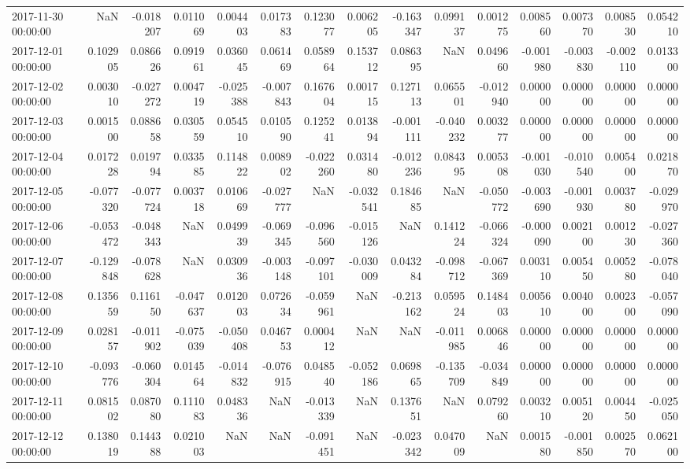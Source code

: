 \begin{tabular}{lrrrrrrrrrrrrrr}
2017-11-30 00:00:00 & NaN & -0.018207 & 0.011069 & 0.004403 & 0.017383 & 0.123077 & 0.006205 & -0.163347 & 0.099137 & 0.001275 & 0.008560 & 0.007370 & 0.008530 & 0.054210 \\
2017-12-01 00:00:00 & 0.102905 & 0.086626 & 0.091961 & 0.036045 & 0.061469 & 0.058964 & 0.153712 & 0.086395 & NaN & 0.049660 & -0.001980 & -0.003830 & -0.002110 & 0.013300 \\
2017-12-02 00:00:00 & 0.003010 & -0.027272 & 0.004719 & -0.025388 & -0.007843 & 0.167604 & 0.001715 & 0.127113 & 0.065501 & -0.012940 & 0.000000 & 0.000000 & 0.000000 & 0.000000 \\
2017-12-03 00:00:00 & 0.001500 & 0.088658 & 0.030559 & 0.054510 & 0.010590 & 0.125241 & 0.013894 & -0.001111 & -0.040232 & 0.003277 & 0.000000 & 0.000000 & 0.000000 & 0.000000 \\
2017-12-04 00:00:00 & 0.017228 & 0.019794 & 0.033585 & 0.114822 & 0.008902 & -0.022260 & 0.031480 & -0.012236 & 0.084395 & 0.005308 & -0.001030 & -0.010540 & 0.005400 & 0.021870 \\
2017-12-05 00:00:00 & -0.077320 & -0.077724 & 0.003718 & 0.010669 & -0.027777 & NaN & -0.032541 & 0.184685 & NaN & -0.050772 & -0.003690 & -0.001930 & 0.003780 & -0.029970 \\
2017-12-06 00:00:00 & -0.053472 & -0.048343 & NaN & 0.049939 & -0.069345 & -0.096560 & -0.015126 & NaN & 0.141224 & -0.066324 & -0.000090 & 0.002100 & 0.001230 & -0.027360 \\
2017-12-07 00:00:00 & -0.129848 & -0.078628 & NaN & 0.030936 & -0.003148 & -0.097101 & -0.030009 & 0.043284 & -0.098712 & -0.067369 & 0.003110 & 0.005450 & 0.005280 & -0.078040 \\
2017-12-08 00:00:00 & 0.135659 & 0.116150 & -0.047637 & 0.012003 & 0.072634 & -0.059961 & NaN & -0.213162 & 0.059524 & 0.148403 & 0.005610 & 0.004000 & 0.002300 & -0.057090 \\
2017-12-09 00:00:00 & 0.028157 & -0.011902 & -0.075039 & -0.050408 & 0.046753 & 0.000412 & NaN & NaN & -0.011985 & 0.006846 & 0.000000 & 0.000000 & 0.000000 & 0.000000 \\
2017-12-10 00:00:00 & -0.093776 & -0.060304 & 0.014564 & -0.014832 & -0.076915 & 0.048540 & -0.052186 & 0.069865 & -0.135709 & -0.034849 & 0.000000 & 0.000000 & 0.000000 & 0.000000 \\
2017-12-11 00:00:00 & 0.081502 & 0.087080 & 0.111083 & 0.048336 & NaN & -0.013339 & NaN & 0.137651 & NaN & 0.079260 & 0.003210 & 0.005120 & 0.004450 & -0.025050 \\
2017-12-12 00:00:00 & 0.138019 & 0.144388 & 0.021003 & NaN & NaN & -0.091451 & NaN & -0.023342 & 0.047009 & NaN & 0.001580 & -0.001850 & 0.002570 & 0.062100 \\

\end{tabular}
